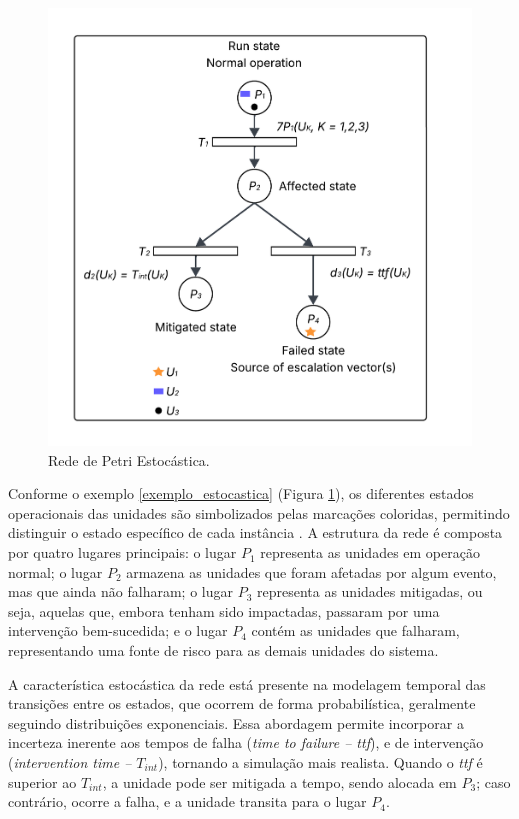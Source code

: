 \documentclass[
	12pt,				%
	openright,			%
	oneside,			%
	a4paper,			%
	english,			%
	brazil				%
	]{abntex2}
\theoremstyle{doispontos}
\begin{document}
\begin{figure}[ht] 
	\centering
	\includegraphics[scale=0.2]{figuras/rede_petri_estocastica.png}
	\caption[Rede de Petri Estocástica]{Rede de Petri Estocástica. \textcite{inproceedings}}
	\label{fig:rede_petri_estocastica}
\end{figure}
\FloatBarrier

Conforme o exemplo \ref{exemplo_estocastica} (Figura \ref{fig:rede_petri_estocastica}), os diferentes estados operacionais das unidades são simbolizados pelas marcações coloridas, permitindo distinguir o estado específico de cada instância \textcite{inproceedings}. A estrutura da rede é composta por quatro lugares principais: o lugar $P_{1}$ representa as unidades em operação normal; o lugar $P_{2}$ armazena as unidades que foram afetadas por algum evento, mas que ainda não falharam; o lugar $P_{3}$ representa as unidades mitigadas, ou seja, aquelas que, embora tenham sido impactadas, passaram por uma intervenção bem-sucedida; e o lugar $P_4$ contém as unidades que falharam, representando uma fonte de risco para as demais unidades do sistema. 

A característica estocástica da rede está presente na modelagem temporal das transições entre os estados, que ocorrem de forma probabilística, geralmente seguindo distribuições exponenciais. Essa abordagem permite incorporar a incerteza inerente aos tempos de falha (\textit{time to failure – ttf}), e de intervenção (\textit{intervention time – $T_{int}$}), tornando a simulação mais realista. Quando o \textit{ttf} é superior ao \textit{$T_{int}$}, a unidade pode ser mitigada a tempo, sendo alocada em $P_{3}$; caso contrário, ocorre a falha, e a unidade transita para o lugar $P_{4}$.
\end{document}
